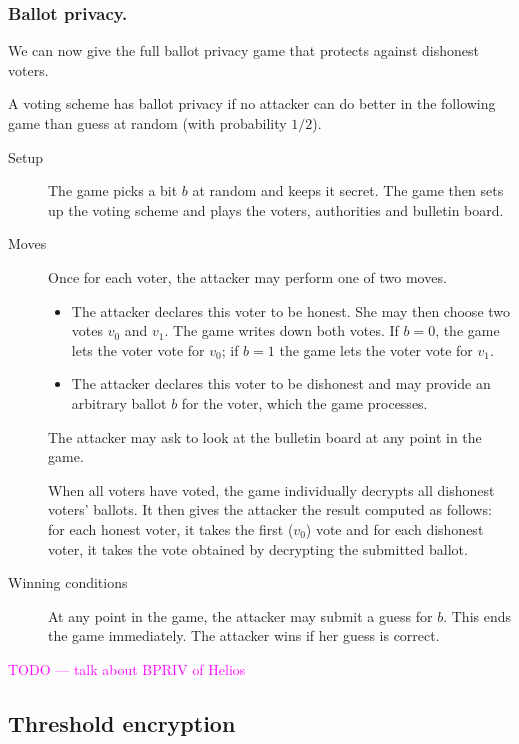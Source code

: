 \documentclass{llncs}
\begin{document}
\subsubsection{Ballot privacy.}
We can now give the full ballot privacy game that protects against dishonest
voters.

\begin{definition}
A voting scheme has ballot privacy if no attacker can do better in the following
game than guess at random (with probability $1/2$).

\begin{description}
\item[Setup] The game picks a bit $b$ at random and keeps it secret. The game
then sets up the voting scheme and plays the voters, authorities and bulletin
board.

\item[Moves] Once for each voter, the attacker may perform one of two moves.
\begin{itemize}
\item The attacker declares this voter to be honest. She may then choose two votes $v_0$ and
$v_1$. The game writes down both votes. If $b = 0$, the game lets the voter vote
for $v_0$; if $b = 1$ the game lets the voter vote for $v_1$.

\item The attacker declares this voter to be dishonest and may provide an
arbitrary ballot $b$ for the voter, which the game processes.
\end{itemize}

The attacker may ask to look at the bulletin board at any point in the game.

When all voters have voted, the game individually decrypts all dishonest voters' ballots. It then gives the attacker the result computed as follows:
for each honest voter, it takes the first ($v_0$) vote and for each dishonest
voter, it takes the vote obtained by decrypting the submitted ballot.

\item[Winning conditions]
At any point in the game, the attacker may submit a guess for $b$. This ends the
game immediately. The attacker wins if her guess is correct.
\end{description}
\end{definition}

\textcolor{Fuchsia}{TODO --- talk about BPRIV of Helios}

\subsection{Threshold encryption}
\end{document}
